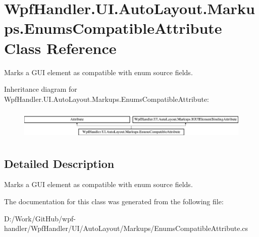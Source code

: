 \hypertarget{class_wpf_handler_1_1_u_i_1_1_auto_layout_1_1_markups_1_1_enums_compatible_attribute}{}\section{Wpf\+Handler.\+U\+I.\+Auto\+Layout.\+Markups.\+Enums\+Compatible\+Attribute Class Reference}
\label{class_wpf_handler_1_1_u_i_1_1_auto_layout_1_1_markups_1_1_enums_compatible_attribute}


Marks a G\+UI element as compatible with enum source fields.  


Inheritance diagram for Wpf\+Handler.\+U\+I.\+Auto\+Layout.\+Markups.\+Enums\+Compatible\+Attribute\+:\begin{figure}[H]
\begin{center}
\leavevmode
\includegraphics[height=1.462141cm]{d0/de7/class_wpf_handler_1_1_u_i_1_1_auto_layout_1_1_markups_1_1_enums_compatible_attribute}
\end{center}
\end{figure}


\subsection{Detailed Description}
Marks a G\+UI element as compatible with enum source fields. 



The documentation for this class was generated from the following file\+:\begin{DoxyCompactItemize}
\item 
D\+:/\+Work/\+Git\+Hub/wpf-\/handler/\+Wpf\+Handler/\+U\+I/\+Auto\+Layout/\+Markups/Enums\+Compatible\+Attribute.\+cs\end{DoxyCompactItemize}
